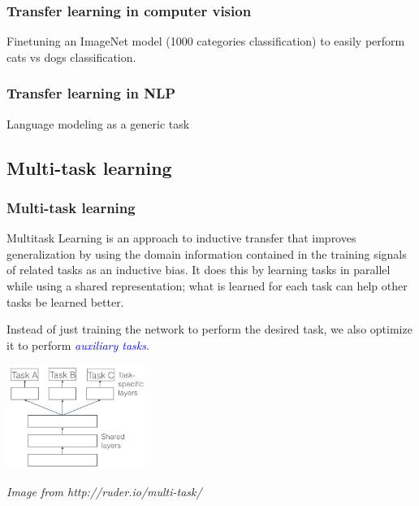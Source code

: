 \documentclass[10pt]{beamer}
\begin{document}
\begin{frame}

  \frametitle{Transfer learning in computer vision}

  Finetuning an ImageNet model (1000 categories classification) to
  easily perform cats vs dogs classification.

\end{frame}

\begin{frame}

  \frametitle{Transfer learning in NLP}

  Language modeling as a generic task

\end{frame}

\subsection{Multi-task learning}

\begin{frame}
  \frametitle{Multi-task learning}

  \bigskip

  \begin{displayquote}
    Multitask Learning is an approach to inductive transfer that
    improves generalization by using the domain information contained
    in the training signals of related tasks as an inductive bias. It
    does this by learning tasks in parallel while using a shared
    representation; what is learned for each task can help other tasks
    be learned better.
  \end{displayquote}

  \bigskip

  Instead of just training the network to perform the desired task, we
  also optimize it to perform \textcolor{blue}{\emph{auxiliary
      tasks}}.

  \begin{center}
    \includegraphics[width = 4.5cm]{images/multi_task_learning.png}
  \end{center}

  {\scriptsize \textit{Image from http://ruder.io/multi-task/}}
\end{frame}
\end{document}
